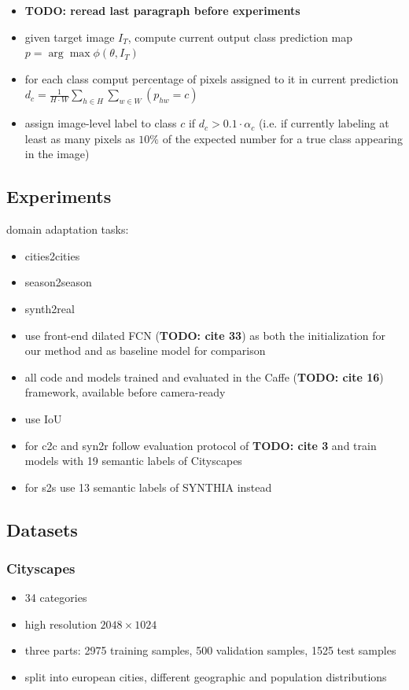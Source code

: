 \documentclass[]{article}
\newcommand{\todo}[1]{{\color{red}\bf{TODO: #1}}}
\begin{document}
\begin{itemize}
	\item \todo{reread last paragraph before experiments}
	\item given target image $I_T$, compute current output class prediction map $p = \arg \max \phi (\theta, I_T)$
	\item for each class comput percentage of pixels assigned to it in current prediction $d_c = \frac{1}{H\cdot W} \sum_{h\in H} \sum_{w\in W}(p_{hw} = c)$
	\item assign image-level label to class $c$ if $d_c > 0.1 \cdot \alpha_c$ (i.e. if currently labeling at least as many pixels as $10\%$ of the expected number for a true class appearing in the image)
\end{itemize}

\subsection{Experiments}
	domain adaptation tasks:
\begin{itemize}
	\item cities2cities
	\item season2season
	\item synth2real
	\item use front-end dilated FCN (\todo{cite 33}) as both the initialization for our method and as baseline model for comparison
	\item all code and models trained and evaluated in the Caffe (\todo{cite 16}) framework, available before camera-ready
	\item use IoU
	\item for c2c and syn2r follow evaluation protocol of \todo{cite 3} and train models with 19 semantic labels of Cityscapes
	\item for s2s use 13 semantic labels of SYNTHIA instead
\end{itemize}

\subsection{Datasets}

\subsubsection{Cityscapes}
\begin{itemize}
	\item 34 categories
	\item high resolution $2048 \times 1024$
	\item three parts: 2975 training samples, 500 validation samples, 1525 test samples
	\item split into european cities, different geographic and population distributions
\end{itemize}
\end{document}
